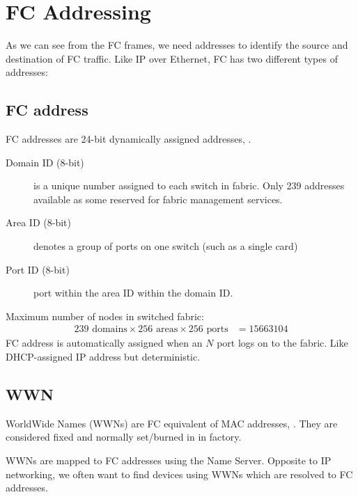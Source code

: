 \section{FC Addressing}
\label{sec:addressing}

As we can see from the FC frames, we need addresses to identify the
source and destination of FC traffic. Like IP over Ethernet, FC has two
different types of addresses:

\subsection{FC address}
\label{sec:fc-address}

FC addresses are 24-bit dynamically assigned addresses, .


\begin{description}
\item[Domain ID (8-bit)]
is a unique number assigned to each switch in fabric. Only 239 addresses
available as some reserved for fabric management services.
\item[Area ID (8-bit)]
denotes a group of ports on one switch (such as a single card)
\item[Port ID (8-bit)]
port within the area ID within the domain ID.
\end{description}

Maximum number of nodes in switched fabric:
\begin{align}
  \mbox{239 domains} \times \mbox{256 areas} \times \mbox{256 ports} & = 15663104 \label{eq:max-number-of-nodes-switched-fabric}
\end{align}
FC address is automatically assigned when an \(N\) port logs on to the
fabric. Like DHCP-assigned IP address but deterministic.

\subsection{WWN}
\label{sec:wwn}

WorldWide Names (WWNs) are FC equivalent of MAC addresses, . They are
considered fixed and normally set/burned in in factory.


WWNs are mapped to FC addresses using the Name Server. Opposite to IP
networking, we often want to find devices using WWNs which are resolved
to FC addresses.

